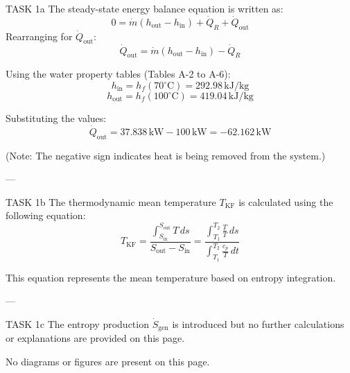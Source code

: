 TASK 1a  
The steady-state energy balance equation is written as:  
\[
0 = \dot{m} \left( h_{\text{out}} - h_{\text{in}} \right) + \dot{Q}_R + \dot{Q}_{\text{out}}
\]  
Rearranging for \( \dot{Q}_{\text{out}} \):  
\[
\dot{Q}_{\text{out}} = \dot{m} \left( h_{\text{out}} - h_{\text{in}} \right) - \dot{Q}_R
\]  

Using the water property tables (Tables A-2 to A-6):  
\[
h_{\text{in}} = h_f(70^\circ\text{C}) = 292.98 \, \text{kJ/kg}
\]  
\[
h_{\text{out}} = h_f(100^\circ\text{C}) = 419.04 \, \text{kJ/kg}
\]  

Substituting the values:  
\[
\dot{Q}_{\text{out}} = 37.838 \, \text{kW} - 100 \, \text{kW} = -62.162 \, \text{kW}
\]  

(Note: The negative sign indicates heat is being removed from the system.)  

---

TASK 1b  
The thermodynamic mean temperature \( T_{\text{KF}} \) is calculated using the following equation:  
\[
T_{\text{KF}} = \frac{\int_{S_{\text{in}}}^{S_{\text{out}}} T \, ds}{S_{\text{out}} - S_{\text{in}}} = \frac{\int_{T_1}^{T_2} \frac{T}{T} \, ds}{\int_{T_1}^{T_2} \frac{c_p}{T} \, dt}
\]  

This equation represents the mean temperature based on entropy integration.

---

TASK 1c  
The entropy production \( \dot{S}_{\text{gen}} \) is introduced but no further calculations or explanations are provided on this page.  

No diagrams or figures are present on this page.